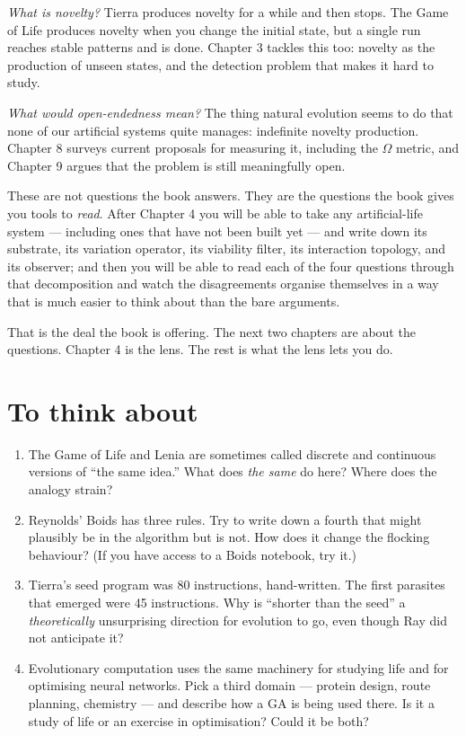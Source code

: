 \textit{What is novelty?} Tierra produces novelty for a while and then
stops. The Game of Life produces novelty when you change the initial
state, but a single run reaches stable patterns and is done. Chapter 3
tackles this too: novelty as the production of unseen states, and the
detection problem that makes it hard to study.

\textit{What would open-endedness mean?} The thing natural evolution
seems to do that none of our artificial systems quite manages:
indefinite novelty production. Chapter 8 surveys current proposals for
measuring it, including the $\Omega$ metric, and Chapter 9 argues that
the problem is still meaningfully open.

These are not questions the book answers. They are the questions the
book gives you tools to \emph{read}. After Chapter 4 you will be able
to take any artificial-life system --- including ones that have not
been built yet --- and write down its substrate, its variation
operator, its viability filter, its interaction topology, and its
observer; and then you will be able to read each of the four questions
through that decomposition and watch the disagreements organise
themselves in a way that is much easier to think about than the bare
arguments.

That is the deal the book is offering. The next two chapters are about
the questions. Chapter 4 is the lens. The rest is what the lens lets
you do.

\section*{To think about}

\begin{enumerate}
  \item The Game of Life and Lenia are sometimes called discrete and
    continuous versions of ``the same idea.'' What does \emph{the same}
    do here? Where does the analogy strain?
  \item Reynolds' Boids has three rules. Try to write down a fourth
    that might plausibly be in the algorithm but is not. How does it
    change the flocking behaviour? (If you have access to a Boids
    notebook, try it.)
  \item Tierra's seed program was 80 instructions, hand-written. The
    first parasites that emerged were 45 instructions. Why is
    ``shorter than the seed'' a \emph{theoretically} unsurprising
    direction for evolution to go, even though Ray did not anticipate
    it?
  \item Evolutionary computation uses the same machinery for studying
    life and for optimising neural networks. Pick a third domain ---
    protein design, route planning, chemistry --- and describe how a
    GA is being used there. Is it a study of life or an exercise in
    optimisation? Could it be both?
\end{enumerate}
